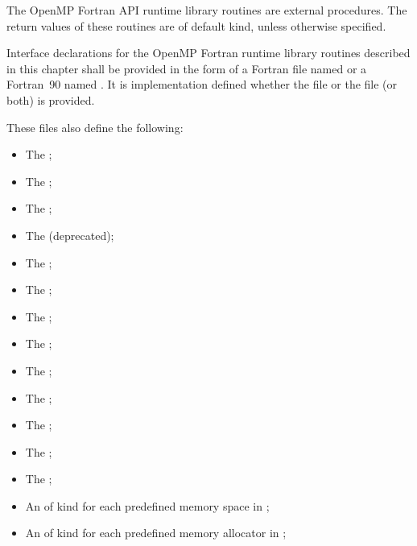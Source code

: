 \begin{fortranspecific}
The OpenMP Fortran API runtime library routines are external procedures. The 
return values of these routines are of default kind, unless otherwise specified.

Interface declarations for the OpenMP Fortran runtime library routines 
described in this chapter shall be provided in the form of a Fortran 
 file named  or a Fortran~90  
named . It is implementation defined whether the
 file or the  file (or both) is provided.

These files also define the following:

\begin{itemize}
\item The   ;
\item The   ;
\item The   ;
\item The    (deprecated);
\item The   ;
\item The   ;
\item The   ;
\item The   ;
\item The   ;
\item The   ;
\item The   ;
\item The   ;
\item The   ;
\item An   of kind  
      for each predefined memory space in ;
\item An   of kind  
      for each predefined memory allocator in ;

\end{itemize}
\end{fortranspecific}
